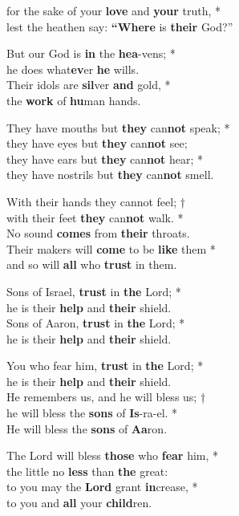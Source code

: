 for the sake of your \textbf{love} and \textbf{your} truth, *\\
lest the heathen say: \textbf{“Where} is \textbf{their} God?”

But our God is \textbf{in} the \textbf{hea}-vens; *\\
he does what\textbf{ev}er \textbf{he} wills.\\
Their idols are \textbf{sil}ver \textbf{and} gold, *\\
the \textbf{work} of \textbf{hu}man hands.

They have mouths but \textbf{they} can\textbf{not} speak; *\\
they have eyes but \textbf{they} can\textbf{not} see;\\
they have ears but \textbf{they} can\textbf{not} hear; *\\
they have nostrils but \textbf{they} can\textbf{not} smell.

With their hands they cannot feel; †\\
with their feet \textbf{they} can\textbf{not} walk. *\\
No sound \textbf{comes} from \textbf{their} throats.\\
Their makers will \textbf{come} to be \textbf{like} them *\\
and so will \textbf{all} who \textbf{trust} in them.

Sons of Israel, \textbf{trust} in \textbf{the} Lord; *\\
he is their \textbf{help} and \textbf{their} shield.\\
Sons of Aaron, \textbf{trust} in \textbf{the} Lord; *\\
he is their \textbf{help} and \textbf{their} shield.

You who fear him, \textbf{trust} in \textbf{the} Lord; *\\
he is their \textbf{help} and \textbf{their} shield.\\
He remembers us, and he will bless us; †\\
he will bless the \textbf{sons} of \textbf{Is}-ra-el. *\\
He will bless the \textbf{sons} of \textbf{Aa}ron.

The Lord will bless \textbf{those} who \textbf{fear} him, *\\
the little no \textbf{less} than \textbf{the} great:\\
to you may the \textbf{Lord} grant \textbf{in}crease, *\\
to you and \textbf{all} your \textbf{child}ren.

